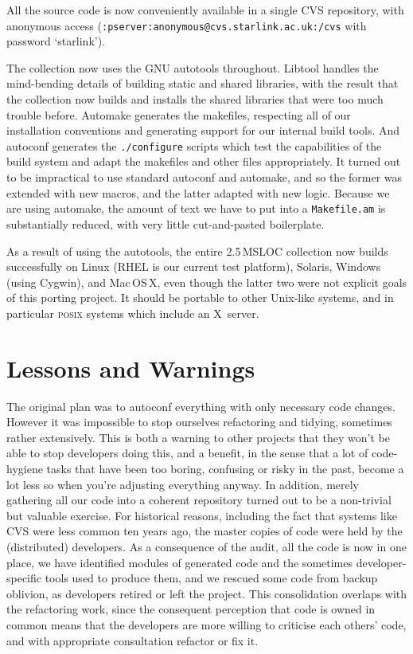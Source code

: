 \documentclass{speauth}
\begin{document}
All the source code is now conveniently available in a single CVS
repository, with anonymous access
(\texttt{:pserver:anonymous@cvs.starlink.ac.uk:/cvs} with password `starlink').

The collection now uses the GNU autotools throughout.  Libtool handles the
mind-bending details of building static and shared libraries, with the
result that the collection now builds and installs the shared
libraries that were too much trouble before.  Automake generates the
makefiles, respecting all of our installation conventions and
generating support for our internal build tools.  And autoconf
generates the \texttt{./configure} scripts which test the capabilities
of the build system and adapt the makefiles and other files
appropriately.  It turned out to be impractical to use standard
autoconf and automake, and so the former was extended with new macros,
and the latter adapted with new logic.  Because we are using automake,
the amount of text we have to put into a \texttt{Makefile.am} is
substantially reduced, with very little cut-and-pasted boilerplate.

As a result of using the autotools, the entire 2.5\,MSLOC collection
now builds successfully on Linux (RHEL is our current test platform),
Solaris, Windows (using Cygwin), and Mac\,OS\,X, even though the
latter two were not explicit goals of this porting project.  It should
be portable to other Unix-like systems, and in particular
\textsc{posix} systems which include an X~server.



\section{Lessons and Warnings}
\label{s:lessons}

The original plan was to autoconf everything with only necessary code
changes.  However it was impossible to stop ourselves refactoring and
tidying, sometimes rather extensively.  This is both a warning to
other projects that they won't be able to stop developers doing this,
and a benefit, in the sense that a lot of code-hygiene tasks that have
been too boring, confusing or risky in the past, become a lot less so
when you're adjusting everything anyway.  In addition, merely
gathering all our code into a coherent repository turned out to be a
non-trivial but valuable exercise.  For historical reasons, including
the fact that systems like CVS were less common ten years ago, the
master copies of code were held by the (distributed) developers.  As a
consequence of the audit, all the code is now in one place, we have
identified modules of generated code and the sometimes
developer-specific tools used to produce them, and we rescued some
code from backup oblivion, as developers retired or left the project.
This consolidation overlaps with the refactoring work, since the
consequent perception that code is owned in common means that the
developers are more willing to criticise each others' code, and with
appropriate consultation refactor or fix it.
\end{document}
